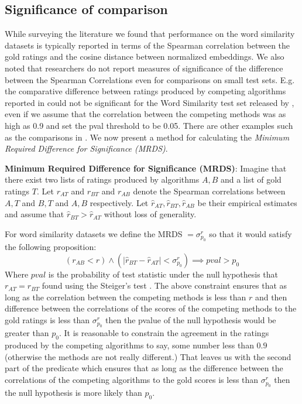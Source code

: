 \documentclass[11pt]{article}
\begin{document}
\subsection{Significance of comparison} \label{ssec:mrds}
While surveying the literature
we found that performance on the word similarity datasets is typically
reported in terms of the Spearman correlation between the gold ratings
and the cosine distance between normalized embeddings.
We also noted that researchers do not report
measures of significance of the difference between
the Spearman Correlations even for comparisons on small test sets.
E.g. the comparative difference between ratings produced by competing
algorithms reported in \cite{faruqui2014retrofitting}  
could not be significant for the Word Similarity test set released by
,
even if we assume that the correlation between the competing methods was as high as 0.9 and set the
pval threshold to be 0.05. There are other examples such as the
comparisons in \cite{hill2014not}. We now present a method for calculating the
\emph{Minimum Required Difference for Significance (MRDS)}. 

\noindent\textbf{Minimum Required Difference for Significance (MRDS)}:
Imagine that there exist two lists of ratings produced by algorithms $A, B$ and a list of gold
ratings $T$. Let $r_{AT}$ and $r_{BT}$ and $r_{AB}$ denote the
Spearman correlations between $A, T$ and $B, T$ and $A, B$ respectively. Let
$\hat{r}_{AT}, \hat{r}_{BT}, \hat{r}_{AB}$ be their empirical
estimates and assume that $\hat{r}_{BT} > \hat{r}_{AT}$ without loss of generality.

For word similarity datasets we define the MRDS $=\sigma_{p_0}^r$ so that it would satisfy the following proposition:
{\small $$ (r_{AB} < r) \land (|\hat{r}_{BT} - \hat{r}_{AT}|{<}\sigma_{p_0}^r)
  {\implies} \textit{pval} > p_0$$}
Where $\textit{pval}$ is the probability of test statistic under the
null hypothesis that $r_{AT} = r_{BT}$ found using the Steiger's test \cite{steiger1980tests}. The above constraint ensures that as long as the correlation between the competing methods is less than $r$ and then difference between the correlations of the scores of the competing methods to the gold ratings is less than $\sigma_{p_0}^r$ then the pvalue of the null hypothesis would be greater than $p_0$.  It is reasonable to constrain the agreement in the ratings produced by the competing algorithms to say, some number less than $0.9$ (otherwise the methods are not really different.) That leaves us with the second part of the predicate which ensures that as long as the difference between the correlations of the competing algorithms to the gold scores is less than $\sigma_{p_0}^r$ then the null hypothesis is more likely than $p_0$.
\end{document}

